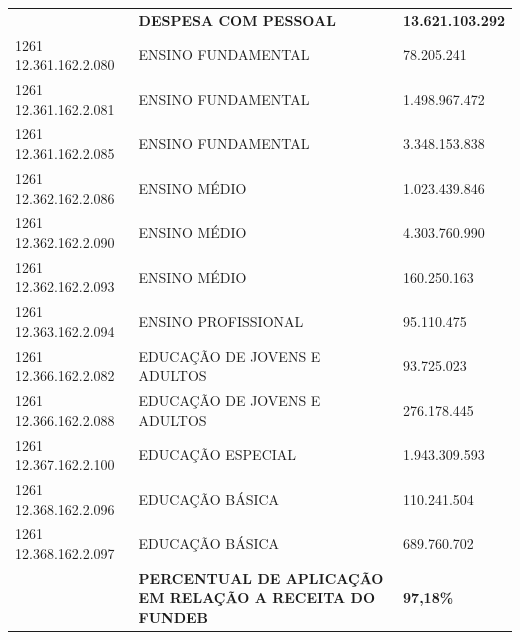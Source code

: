 \documentclass{article}
\begin{document}
\begin{longtable}[c]{m{3cm}|m{12cm}|m{3cm}}
\multicolumn{1}{L{3cm}|}{ \textbf{}} & \multicolumn{1}{L{12cm}|}{ \textbf{DESPESA COM PESSOAL}} & \multicolumn{1}{R{3cm}}{ \textbf{13.621.103.292}} \\
\multicolumn{1}{L{3cm}|}{1261 12.361.162.2.080} & \multicolumn{1}{L{12cm}|}{ENSINO FUNDAMENTAL} & \multicolumn{1}{R{3cm}}{78.205.241} \\
\multicolumn{1}{L{3cm}|}{1261 12.361.162.2.081} & \multicolumn{1}{L{12cm}|}{ENSINO FUNDAMENTAL} & \multicolumn{1}{R{3cm}}{1.498.967.472} \\
\multicolumn{1}{L{3cm}|}{1261 12.361.162.2.085} & \multicolumn{1}{L{12cm}|}{ENSINO FUNDAMENTAL} & \multicolumn{1}{R{3cm}}{3.348.153.838} \\
\multicolumn{1}{L{3cm}|}{1261 12.362.162.2.086} & \multicolumn{1}{L{12cm}|}{ENSINO MÉDIO} & \multicolumn{1}{R{3cm}}{1.023.439.846} \\
\multicolumn{1}{L{3cm}|}{1261 12.362.162.2.090} & \multicolumn{1}{L{12cm}|}{ENSINO MÉDIO} & \multicolumn{1}{R{3cm}}{4.303.760.990} \\
\multicolumn{1}{L{3cm}|}{1261 12.362.162.2.093} & \multicolumn{1}{L{12cm}|}{ENSINO MÉDIO} & \multicolumn{1}{R{3cm}}{160.250.163} \\
\multicolumn{1}{L{3cm}|}{1261 12.363.162.2.094} & \multicolumn{1}{L{12cm}|}{ENSINO PROFISSIONAL} & \multicolumn{1}{R{3cm}}{95.110.475} \\
\multicolumn{1}{L{3cm}|}{1261 12.366.162.2.082} & \multicolumn{1}{L{12cm}|}{EDUCAÇÃO DE JOVENS E ADULTOS} & \multicolumn{1}{R{3cm}}{93.725.023} \\
\multicolumn{1}{L{3cm}|}{1261 12.366.162.2.088} & \multicolumn{1}{L{12cm}|}{EDUCAÇÃO DE JOVENS E ADULTOS} & \multicolumn{1}{R{3cm}}{276.178.445} \\
\multicolumn{1}{L{3cm}|}{1261 12.367.162.2.100} & \multicolumn{1}{L{12cm}|}{EDUCAÇÃO ESPECIAL} & \multicolumn{1}{R{3cm}}{1.943.309.593} \\
\multicolumn{1}{L{3cm}|}{1261 12.368.162.2.096} & \multicolumn{1}{L{12cm}|}{EDUCAÇÃO BÁSICA} & \multicolumn{1}{R{3cm}}{110.241.504} \\
\multicolumn{1}{L{3cm}|}{1261 12.368.162.2.097} & \multicolumn{1}{L{12cm}|}{EDUCAÇÃO BÁSICA} & \multicolumn{1}{R{3cm}}{689.760.702} \\
\hline\hline
\multicolumn{1}{L{3cm}|}{ \textbf{}} & \multicolumn{1}{L{12cm}|}{ \textbf{PERCENTUAL DE APLICAÇÃO EM RELAÇÃO A RECEITA DO FUNDEB}} & \multicolumn{1}{R{3cm}}{ \textbf{97,18\%}} \\\hline\hline\hline\end{longtable}\vspace{-0.4cm} \raggedright\fontsize{7pt}{10pt}\selectfont {Fonte: PPO.} \\\fontsize{7pt}{10pt}\selectfont {ELABORAÇÃO: DCAF/SCPPO/SEPLAG}\\
\end{document}
